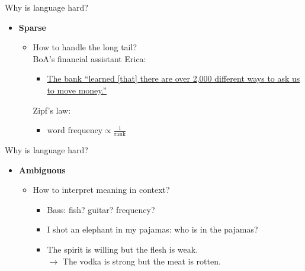 \documentclass[usenames,dvipsnames,notes]{beamer}
\begin{document}
\begin{frame}
    {Why is language hard?}
    \begin{itemize}
        \itemsep1em
        \item \textbf{Sparse} 
            \begin{itemize}
                \item How to handle the long tail?\\
                \medskip
                BoA's financial assistant Erica:\\
                \begin{itemize}
                    \item[] 
                        \hyperlink{https://www.aiqudo.com/2019/06/28/voice-success-story-erica-bank-america/}{The bank ``learned [that] there are over 2,000 different ways to ask us to move money.''}
                \end{itemize}
                \medskip
                Zipf's law:\\
                \begin{itemize}
                    \item[] 
                        $\text{word frequency} \propto \frac{1}{\text{rank}}$
                \end{itemize}
            \end{itemize}
    \end{itemize}
\end{frame}

\begin{frame}
    {Why is language hard?}
    \begin{itemize}
        \item \textbf{Ambiguous} 
            \begin{itemize}
                \item How to interpret meaning in context?
                \medskip
                \begin{itemize}
                    \itemsep2em
                    \item[] Bass: fish? guitar? frequency? 
                    \item[] I shot an elephant in my pajamas: who is in the pajamas?
                    \item[] The spirit is willing but the flesh is weak.\\
                        $\rightarrow$ 
                        The vodka is strong but the meat is rotten.
                \end{itemize}
            \end{itemize}
    \end{itemize}
\end{frame}
\end{document}

